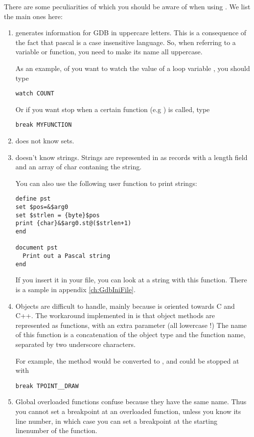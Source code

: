 There are some peculiarities of \fpc which you should be aware of when using
. We list the main ones here:
\begin{enumerate}
\item \fpc generates information for GDB in uppercare letters. This is a
consequence of the fact that pascal is a case insensitive language. So, when
referring to a variable or function, you need to make its name all
uppercase.

As an example, of you want to watch the value of a loop variable
, you should type
\begin{verbatim}
watch COUNT
\end{verbatim}
Or if you want stop when a certain function (e.g ) is called,
type
\begin{verbatim}
break MYFUNCTION
\end{verbatim}

\item {} does not know sets.

\item {} doesn't know strings. Strings are represented in 
as records with a length field and an array of char contaning the string.

You can also use the following user function to print strings:
\begin{verbatim}
define pst
set $pos=&$arg0
set $strlen = {byte}$pos
print {char}&$arg0.st@($strlen+1)
end

document pst
  Print out a Pascal string
end
\end{verbatim}
If you insert it in your  file, you can look at a string with this
function. There is a sample  in appendix \ref{ch:GdbIniFile}.

\item Objects are difficult to handle, mainly because  is oriented
towards C and C++. The workaround implemented in \fpc is that object methods
are represented as functions, with an extra parameter  (all
lowercase !) The name of this function is a concatenation of the object type
and the function name, separated by two underscore characters.

For example, the method  would be converted to
, and could be stopped at with
\begin{verbatim}
break TPOINT__DRAW
\end{verbatim}

\item Global overloaded functions confuse  because they have the same
name. Thus you cannot set a breakpoint at an overloaded function, unless you
know its line number, in which case you can set a breakpoint at the
starting linenumber of the function.
\end{enumerate}

